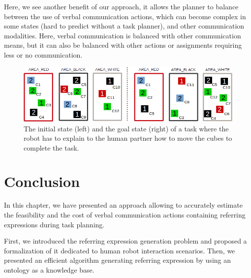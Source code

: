 \documentclass[a4paper,11pt,twoside]{StyleThese}
\begin{document}
Here, we see another benefit of our approach, it allows the planner to balance between the use of verbal communication actions, which can become complex in some states (hard to predict without a task planner), and other communication modalities. %
Here, verbal communication is balanced with other communication means, but it can also be balanced with other actions or assignments requiring less or no communication.

\begin{figure}[t!]
\centering
\includegraphics[scale=0.5]{figures/chapter3/case3.png}
\caption{\label{fig:case3} The initial state (left) and the goal state (right) of a task where the robot has to explain to the human partner how to move the cubes to complete the task. }
\end{figure}




\section{Conclusion}
In this chapter, we have presented an approach allowing to accurately estimate the feasibility and the cost of verbal communication actions containing referring expressions during task planning.

First, we introduced the referring expression generation problem and proposed a formalization of it dedicated to human robot interaction scenarios. Then, we presented an efficient algorithm generating referring expression by using an ontology as a knowledge base.
\end{document}
